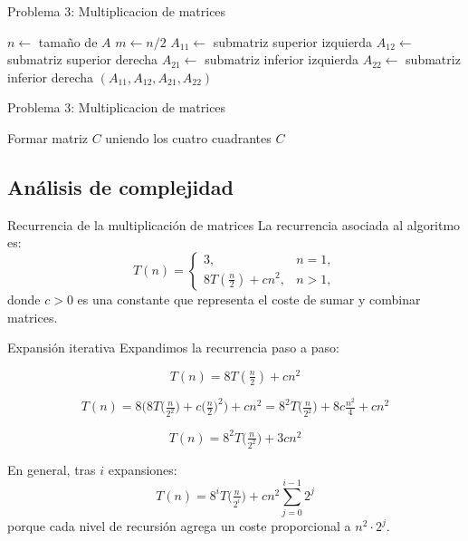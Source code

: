 \documentclass{beamer}
\begin{document}
\begin{frame}{Problema 3: Multiplicacion de matrices}
\begin{algorithm}[H]
\caption{Dividir y combinar matrices}
\begin{algorithmic}[1]
  \State $n \gets$ tamaño de $A$
  \State $m \gets n/2$
  \State $A_{11} \gets$ submatriz superior izquierda
  \State $A_{12} \gets$ submatriz superior derecha
  \State $A_{21} \gets$ submatriz inferior izquierda
  \State $A_{22} \gets$ submatriz inferior derecha
  \State \Return $(A_{11}, A_{12}, A_{21}, A_{22})$
\EndFunction
\end{algorithmic}
\end{algorithm}
\end{frame}




\begin{frame}{Problema 3: Multiplicacion de matrices}
\begin{algorithm}[H]
\caption{Dividir y combinar matrices}
\begin{algorithmic}[1]

  \State Formar matriz $C$ uniendo los cuatro cuadrantes
  \State \Return $C$
\EndFunction
\end{algorithmic}
\end{algorithm}
\end{frame}


\subsection{Análisis de complejidad}
\begin{frame}{Recurrencia de la multiplicación de matrices}
La recurrencia asociada al algoritmo es:
\[
T(n) =
\begin{cases}
3, & n = 1, \\[6pt]
8T\!\left(\tfrac{n}{2}\right) + c n^2, & n > 1,
\end{cases}
\]
donde $c>0$ es una constante que representa el coste de sumar y combinar matrices.
\end{frame}

\begin{frame}{Expansión iterativa}
Expandimos la recurrencia paso a paso:

\[
T(n) = 8T\!\left(\tfrac{n}{2}\right) + c n^2
\]

\[
T(n) = 8\Big(8T\!\big(\tfrac{n}{2^2}\big) + c\big(\tfrac{n}{2}\big)^2\Big) + c n^2
= 8^2 T\!\big(\tfrac{n}{2^2}\big) + 8c \tfrac{n^2}{4} + c n^2
\]

\[
T(n) = 8^2 T\!\big(\tfrac{n}{2^2}\big) + 3c n^2
\]

En general, tras $i$ expansiones:
\[
T(n) = 8^i T\!\big(\tfrac{n}{2^i}\big) + c n^2 \sum_{j=0}^{i-1} 2^j
\]
porque cada nivel de recursión agrega un coste proporcional a $n^2 \cdot 2^j$.
\end{frame}
\end{document}
